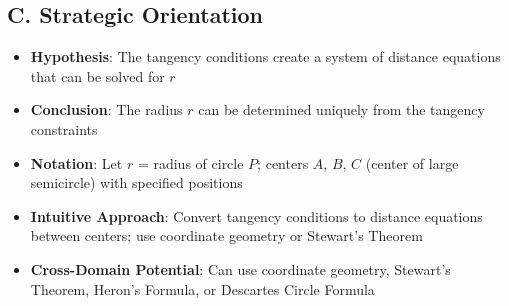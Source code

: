\documentclass[]{article}
\begin{document}
\begin{problemconfigbox}
\subsection*{C. Strategic Orientation}
\begin{itemize}[leftmargin=*]
    \item \textbf{Hypothesis}: The tangency conditions create a system of distance equations that can be solved for $r$
    \item \textbf{Conclusion}: The radius $r$ can be determined uniquely from the tangency constraints
    \item \textbf{Notation}: Let $r$ = radius of circle $P$; centers $A$, $B$, $C$ (center of large semicircle) with specified positions
    \item \textbf{Intuitive Approach}: Convert tangency conditions to distance equations between centers; use coordinate geometry or Stewart's Theorem
    \item \textbf{Cross-Domain Potential}: Can use coordinate geometry, Stewart's Theorem, Heron's Formula, or Descartes Circle Formula
\end{itemize}
\end{problemconfigbox}
\end{document}
